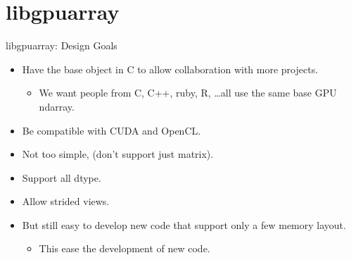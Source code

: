 \documentclass[utf8x,xcolor=pdftex,dvipsnames,table]{beamer}
\begin{document}


\section{libgpuarray}
\begin{frame}
  \tableofcontents[currentsection]
\end{frame}

\begin{frame}{libgpuarray: Design Goals}
  \begin{itemize}
  \item Have the base object in C to allow collaboration with more projects.
    \begin{itemize}
    \item We want people from C, C++, ruby, R, \ldots all use the same base GPU ndarray.
    \end{itemize}
  \item Be compatible with CUDA and OpenCL.
  \item Not too simple, (don’t support just matrix).
  \item Support all dtype.
  \item Allow strided views.
  \item But still easy to develop new code that support only a few memory layout.
    \begin{itemize}
    \item This ease the development of new code.
    \end{itemize}
  \end{itemize}
\end{frame}
\end{document}
